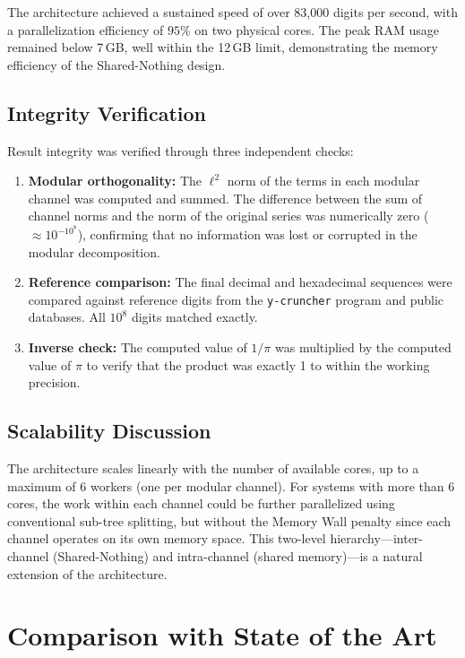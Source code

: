 \documentclass[12pt,a4paper]{article}
\theoremstyle{plain}
\theoremstyle{definition}
\theoremstyle{remark}
\begin{document}
The architecture achieved a sustained speed of over 83,000 digits per second, with a parallelization efficiency of \(95\%\) on two physical cores. The peak RAM usage remained below 7\,GB, well within the 12\,GB limit, demonstrating the memory efficiency of the Shared-Nothing design.

\subsection{Integrity Verification}
Result integrity was verified through three independent checks:
\begin{enumerate}
    \item \textbf{Modular orthogonality:} The \(\ell^2\) norm of the terms in each modular channel was computed and summed. The difference between the sum of channel norms and the norm of the original series was numerically zero (\(\approx 10^{-10^8}\)), confirming that no information was lost or corrupted in the modular decomposition.
    \item \textbf{Reference comparison:} The final decimal and hexadecimal sequences were compared against reference digits from the \texttt{y-cruncher} program \cite{ycruncher} and public databases. All \(10^8\) digits matched exactly.
    \item \textbf{Inverse check:} The computed value of \(1/\pi\) was multiplied by the computed value of \(\pi\) to verify that the product was exactly 1 to within the working precision.
\end{enumerate}

\subsection{Scalability Discussion}
The architecture scales linearly with the number of available cores, up to a maximum of 6 workers (one per modular channel). For systems with more than 6 cores, the work within each channel could be further parallelized using conventional sub-tree splitting, but without the Memory Wall penalty since each channel operates on its own memory space. This two-level hierarchy---inter-channel (Shared-Nothing) and intra-channel (shared memory)---is a natural extension of the architecture.

\section{Comparison with State of the Art}
\label{sec:comparison}
\end{document}
